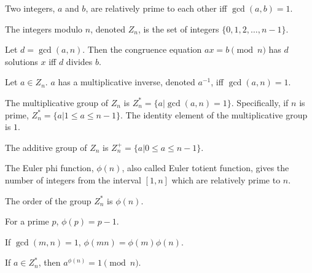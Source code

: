 \begin{defn}
  Two integers, $a$ and $b$, are relatively prime to each other iff
  \mbox{$\gcd(a,b)=1$}.
\end{defn}

\begin{defn}
  The integers modulo $n$, denoted $Z_n$, is the set of integers
  \mbox{$\{ 0,1,2,\ldots,n-1 \}$}.
\end{defn}

\begin{thm}
  Let $d = \gcd(a, n)$. Then the congruence equation $a x = b \pmod{n}$ has
  $d$ solutions $x$ iff $d$ divides $b$.
\end{thm}

\begin{corr}
  Let $a \in Z_n$. $a$ has a multiplicative inverse, denoted $a^{-1}$,
  iff \mbox{$\gcd(a, n) = 1$}.
\end{corr}

\begin{defn}
  The multiplicative group of $Z_n$ is $Z_n^* = \{a | \gcd(a,n) = 1
  \}$.  Specifically, if $n$ is prime, $Z_n^* = \{a | 1 \leq a \leq n-1
  \}$. The identity element of the multiplicative group is $1$.
\end{defn}

\begin{defn}
  The additive group of $Z_n$ is $Z_n^+ = \{a | 0 \leq a \leq n-1 \}$.
\end{defn}

\begin{defn}
  The Euler phi function, $\phi(n)$, also called Euler totient
  function, gives the number of integers from the interval $[1,n]$
  which are relatively prime to $n$.
\end{defn}

\begin{corr}
  The order of the group $Z_n^*$ is $\phi(n)$.
\end{corr}

\begin{corr}
  For a prime $p$, $\phi(p) = p-1$.
\end{corr}

\begin{corr}
  If $\gcd(m, n) = 1$, $\phi(m n) = \phi(m) \phi(n)$.
\end{corr}

\begin{thm}
  If $a \in Z_n^*$, then $a^{\phi(n)} = 1 \pmod{n}$.
\end{thm}

